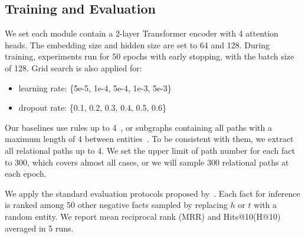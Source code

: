 \documentclass{article}
\begin{document}
\subsection{Training and Evaluation}
We set each module contain a 2-layer Transformer encoder with 4 attention heads.
The embedding size and hidden size are set to 64 and 128.
During training, experiments run for 50 epochs with early stopping, with the batch size of 128.
Grid search is also applied for:

\begin{itemize}[nosep,left=1em]
\item learning rate: \{5e-5, 1e-4, 5e-4, 1e-3, 5e-3\}
\item dropout rate: \{0.1, 0.2, 0.3, 0.4, 0.5, 0.6\}
\end{itemize}


Our baselines use rules up to 4~\cite{rulen}, or subgraphs
containing all paths with a maximum length of 4 between entities~\cite{grail}.
To be consistent with them, we extract all relational paths up to 4.
We set the upper limit of path number for each fact to 300, which covers almost all cases, or we will sample 300 relational paths at each epoch.



We apply the standard evaluation protocols proposed by~\cite{grail}.
Each fact for inference is ranked among 50 other negative facts sampled by replacing $h$ or $t$ with a random entity.
We report mean reciprocal rank (MRR) and Hits@10(H@10) averaged in 5 runs.
\end{document}

